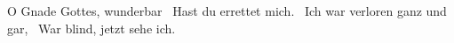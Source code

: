 O Gnade Gottes, wunderbar 
Hast du errettet mich. 
Ich war verloren ganz und gar, 
War blind, jetzt sehe ich. 

